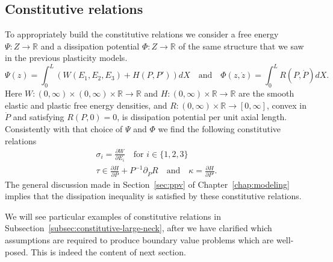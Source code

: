 \documentclass[a4paper,10pt,twoside]{amsbook}
\numberwithin{section}{chapter}
\numberwithin{equation}{chapter}
\theoremstyle{definition}
\newtheorem{prop}{Proposition}[chapter]
\newcommand{\dind}[2]{\frac{\partial #1}{\partial #2}}
\begin{document}
\subsection{Constitutive relations}

To appropriately build the constitutive relations we consider a free energy $\Psi\colon Z\to\mathbb{R}$ and a dissipation potential $\Phi\colon Z\to\mathbb{R}$ of the same structure that we saw in the previous plasticity models.
\begin{equation}
\Psi(z)=\int_0^L\left(W(E_1,E_2,E_3)+H(P,P')\right)dX\quad\text{and}\quad\Phi(z,\dot z)=\int_0^LR(P,\dot P)dX.
\end{equation}
Here $W\colon(0,\infty)\times(0,\infty)\times\mathbb{R}\to\mathbb{R}$ and $H\colon(0,\infty)\times\mathbb{R}\to\mathbb{R}$ are the smooth elastic and plastic free energy densities, and $R\colon(0,\infty)\times\mathbb{R}\to[0,\infty]$, convex in $\dot P$ and satisfying $R(P,0)=0$, is dissipation potential per unit axial length. Consistently with that choice of $\Psi$ and $\Phi$ we find the following constitutive relations
\begin{subequations}
\label{eqn:constitutive-neck-large}
\begin{gather}
\sigma_i=\dind{W}{E_i}\quad\text{for $i\in\{1,2,3\}$} \\
\tau\in\dind{H}{P}+P^{-1}\partial_{\dot P}R\quad\text{and}\quad\kappa=\dind{H}{P'}.
\end{gather}
\end{subequations}
The general discussion made in Section~\ref{sec:ppv} of Chapter~\ref{chap:modeling} implies that the dissipation inequality is satisfied by these constitutive relations.

We will see particular examples of constitutive relations in Subsection~\ref{subsec:constitutive-large-neck}, after we have clarified which assumptions are required to produce boundary value problems which are well-posed. This is indeed the content of next section.
\end{document}
